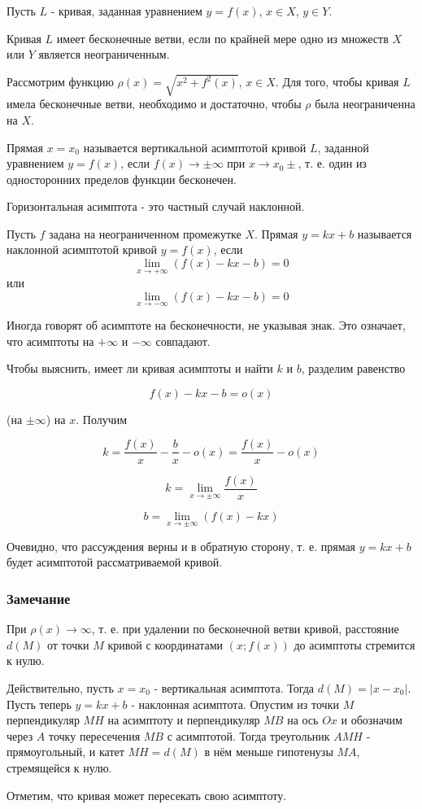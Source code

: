 Пусть $L$ - кривая, заданная уравнением $y=f(x)$, $x \in X$, $y \in Y$.

\opred

Кривая $L$ имеет бесконечные ветви, если по крайней мере одно из множеств $X$ или $Y$ является неограниченным.

Рассмотрим функцию $\rho(x)=\sqrt{x^2+f^2(x)}$, $x \in X$. Для того, чтобы кривая $L$ имела бесконечные ветви, необходимо и достаточно, чтобы $\rho$ была неограниченна на $X$.

\opred

Прямая $x=x_0$ называется вертикальной асимптотой кривой $L$, заданной уравнением $y=f(x)$, если $f(x) \to \pm \infty$ при $x \to x_0 \pm$, т. е. один из односторонних пределов функции бесконечен.

Горизонтальная асимптота - это частный случай наклонной.

\opred

Пусть $f$ задана на неограниченном промежутке $X$. Прямая $y=kx+b$ называется наклонной асимптотой кривой $y=f(x)$, если
\[
\lim_{x\to + \infty}(f(x)-kx-b)=0
\]
или
\[
\lim_{x\to - \infty}(f(x)-kx-b)=0
\]

Иногда говорят об асимптоте на бесконечности, не указывая знак. Это означает, что асимптоты на $+\infty$ и $-\infty$ совпадают.

Чтобы выяснить, имеет ли кривая асимптоты и найти $k$ и $b$, разделим равенство

$$
f(x)-kx-b=o(x)
$$

(на $\pm \infty$) на $x$. Получим

$$
k=\frac{f(x)}{x}-\frac{b}{x}-o(x)=\frac{f(x)}{x}-o(x)
$$

\[
k=\lim_{x \to \pm \infty}\frac{f(x)}{x}
\]

\[
b=\lim_{x \to \pm \infty}(f(x)-kx)
\]

Очевидно, что рассуждения верны и в обратную сторону, т. е. прямая $y=kx+b$ будет асимптотой рассматриваемой кривой.

\subsubsection{Замечание}

При $\rho(x) \to \infty$, т. е. при удалении по бесконечной ветви кривой, расстояние $d(M)$ от точки $M$ кривой с координатами $(x; f(x))$ до асимптоты стремится к нулю.

Действительно, пусть $x=x_0$ - вертикальная асимптота. Тогда $d(M)=|x-x_0|$.
Пусть теперь $y=kx+b$ - наклонная асимптота. Опустим из точки $M$ перпендикуляр $MH$ на асимптоту и перпендикуляр $MB$ на ось $Ox$ и обозначим через $A$ точку пересечения $MB$ с асимптотой. Тогда треугольник $AMH$ - прямоугольный, и катет $MH=d(M)$ в нём меньше гипотенузы $MA$, стремящейся к нулю.

Отметим, что кривая может пересекать свою асимптоту.

